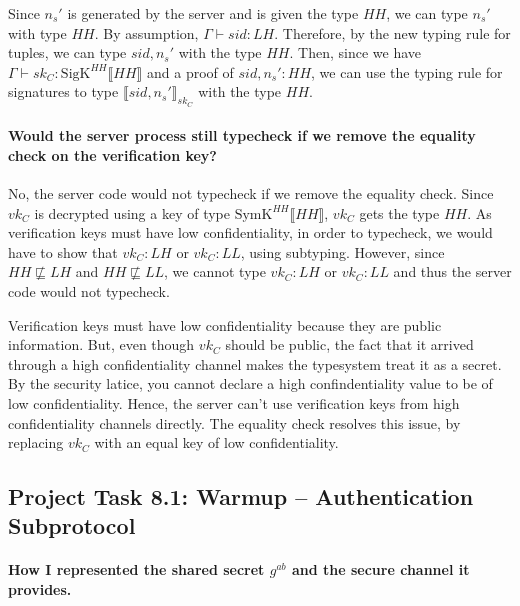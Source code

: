 \documentclass[12pt,a4paper]{article}
\begin{document}
Since $n_s'$ is generated by the server and is given the type $HH$, we can type $n_s'$ with type $HH$.
By assumption, $\Gamma \vdash sid: LH$. Therefore, by the new typing rule for tuples, we can type $sid,n_s'$ with the type $HH$.
Then, since we have $\Gamma \vdash sk_C: \mathrm{SigK}^{HH}\llbracket HH \rrbracket$ and a proof of $sid,n_s': HH$, we can use the typing rule for signatures to type $\llbracket sid, n_s' \rrbracket_{sk_C}$ with the type $HH$.

\paragraph{Would the server process still typecheck if we remove the equality check on the verification key?}

No, the server code would not typecheck if we remove the equality check.
Since $vk_C$ is decrypted using a key of type $\mathrm{SymK}^{HH}\llbracket HH \rrbracket$, $vk_C$ gets the type $HH$.
As verification keys must have low confidentiality, in order to typecheck, we would have to show that $vk_C: LH$ or $vk_C: LL$, using subtyping.
However, since $HH \not\sqsubseteq LH$ and $HH \not\sqsubseteq LL$, we cannot type $vk_C: LH$ or $vk_C: LL$ and thus the server code would not typecheck.

Verification keys must have low confidentiality because they are public information.
But, even though $vk_C$ should be public, the fact that it arrived through a high confidentiality channel makes the typesystem treat it as a secret.
By the security latice, you cannot declare a high confindentiality value to be of low confidentiality. Hence, the server can't use verification keys from high confidentiality channels directly.
The equality check resolves this issue, by replacing $vk_C$ with an equal key of low confidentiality.

\subsection*{Project Task 8.1: Warmup -- Authentication Subprotocol}
\paragraph{How I represented the shared secret $g^{ab}$ and the secure channel it provides.}
\end{document}

